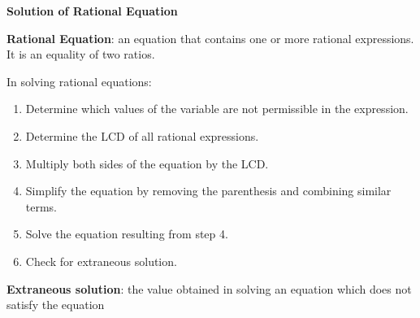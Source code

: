 \begin{center}
\textbf{Solution of Rational Equation}
\end{center}

\vspace*{1ex}

\textbf{Rational Equation}: an equation that contains one or more rational expressions. It is an equality of two ratios.




In solving rational equations:
\begin{enumerate}[label = \arabic*. ]
\item Determine which values of the variable are not permissible in the expression.
\item Determine the LCD of all rational expressions.
\item Multiply both sides of the equation by the LCD.
\item Simplify the equation by removing the parenthesis and combining similar terms.
\item Solve the equation resulting from step 4.
\item Check for extraneous solution.

\end{enumerate}   

\textbf{Extraneous solution}:  the value obtained in solving an equation which does not satisfy the equation
